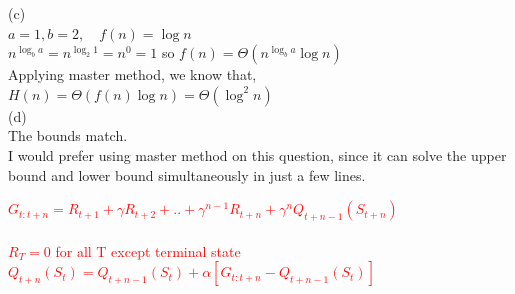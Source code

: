 \documentclass[12pt]{article}
\begin{document}
\noindent(c)\\
$a = 1, b = 2, \quad f(n) = \log n$\\
$n^{\log_ba} = n^{\log_2 1} = n^0 = 1$ so $f(n) = \Theta(n^{\log_ba}\log n)$\\
Applying master method, we know that, $H(n) = \Theta(f(n) \log n) =  \Theta(\log^2 n)  $\\




\noindent(d)\\
The bounds match.\\
I would prefer using master method on this question, since it can solve the upper bound and lower bound simultaneously in just a few lines.


\pagebreak


 \textcolor{red}{ 
 $G_{t:t+n} = R_{t+1} + \gamma R_{t+2}+..+\gamma^{n-1} R_{t+n} + \gamma^nQ_{t+n-1}(S_{t+n})$\\
 }\\
 
   \textcolor{red}{ 
  $R_T = 0$ for all T except terminal state
 }\\
 
 
  \textcolor{red}{ 
  $Q_{t+n}(S_{t}) = Q_{t+n-1}(S_{t})+\alpha [G_{t:t+n} -Q_{t+n-1}(S_{t}) ]$\\
 }
 
 
\end{document}
